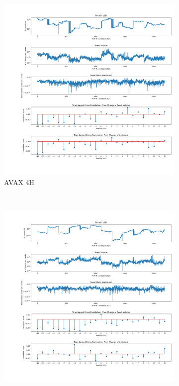 \documentclass[11pt]{article}
\begin{document}
\begin{figure}[H]
\begin{subfigure}[b]{0.45\textwidth}
         \includegraphics[width=\textwidth]{figures/crosscorrAVAX_4h_range(-12, 13).png}
         \caption{AVAX 4H}
         \label{AVAX 4H}
     \end{subfigure} 
     \hfill \\
     \begin{subfigure}[b]{0.45\textwidth}
         \centering
         \includegraphics[width=\textwidth]{figures/crosscorrFTM_4h_range(-12, 13).png}

\end{subfigure}
\end{figure}
\end{document}
